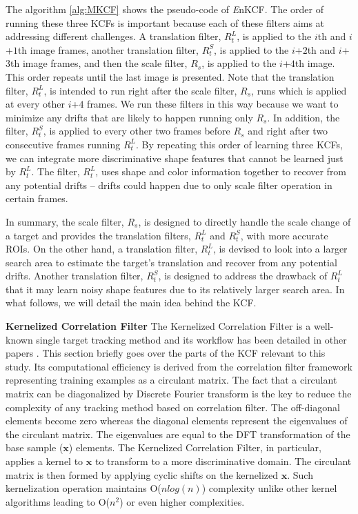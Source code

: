 \documentclass[10pt,twocolumn,letterpaper]{article}
\begin{document}
The algorithm \ref{alg:MKCF} shows the pseudo-code of {\it E}nKCF.
The order of running these three KCFs is important because each of
these filters aims at addressing different challenges. A translation
filter, $R_{t}^{L}$, is applied to the $i$th and $i$+$1$th image
frames, another translation filter, $R_{t}^{S}$, is applied to the
$i$+$2$th and $i$+$3$th image frames, and then the scale filter,
$R_{s}$, is applied to the $i$+$4$th image. This order repeats until
the last image is presented. Note that the translation filter,
$R_{t}^{L}$, is intended to run right after the scale filter, $R_s$,
runs which is applied at every other $i$+$4$ frames. We run these
filters in this way because we want to minimize any drifts that are
likely to happen running only $R_{s}$. In addition, the filter,
$R_{t}^{S}$, is applied to every other two frames before $R_{s}$ and
right after two consecutive frames running $R_{t}^{L}$. By repeating
this order of learning three KCFs, we can integrate more
discriminative shape features that cannot be learned just by
$R_{t}^{L}$. The filter, $R_{t}^{L}$, uses shape and color information
together to recover from any potential drifts -- drifts could happen
due to only scale filter operation in certain frames.

In summary, the scale filter, $R_{s}$, is designed to directly handle
the scale change of a target and provides the translation filters,
$R_{t}^{L}$ and $R_{t}^{S}$, with more accurate ROIs. On the other
hand, a translation filter, $R_{t}^{L}$, is devised to look into a
larger search area to estimate the target's translation and recover
from any potential drifts. Another translation filter, $R_{t}^{S}$, is
designed to address the drawback of $R_{t}^{L}$ that it may learn
noisy shape features due to its relatively larger search area. In what
follows, we will detail the main idea behind the KCF.

\textbf{Kernelized Correlation Filter} The Kernelized Correlation
Filter is a well-known single target tracking method and its workflow
has been detailed in other papers
\cite{henriques2012exploiting,henriques2015high}. This section briefly
goes over the parts of the KCF relevant to this study. Its
computational efficiency is derived from the correlation filter
framework representing training examples as a circulant matrix. The
fact that a circulant matrix can be diagonalized by Discrete Fourier
transform is the key to reduce the complexity of any tracking method
based on correlation filter. The off-diagonal elements become zero
whereas the diagonal elements represent the eigenvalues of the
circulant matrix. The eigenvalues are equal to the DFT transformation
of the base sample ($\mathbf{x}$) elements. The Kernelized Correlation
Filter, in particular, applies a kernel to $\mathbf{x}$ to transform
to a more discriminative domain. The circulant matrix is then formed
by applying cyclic shifts on the kernelized $\mathbf{x}$. Such
kernelization operation maintains O($nlog(n)$) complexity unlike other
kernel algorithms leading to O($n^{2}$) or even higher complexities.
\end{document}
